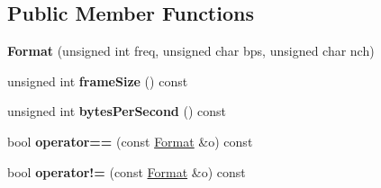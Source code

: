 \subsection*{Public Member Functions}
\begin{DoxyCompactItemize}
\item 
{\bfseries Format} (unsigned int freq, unsigned char bps, unsigned char nch)\hypertarget{structAudio_1_1Format_a7ec0f8459bfb19ee0994865d88bf6680}{}\label{structAudio_1_1Format_a7ec0f8459bfb19ee0994865d88bf6680}

\item 
unsigned int {\bfseries frame\+Size} () const \hypertarget{structAudio_1_1Format_a3bb725504e8f6a166c06c8ba29d3ea15}{}\label{structAudio_1_1Format_a3bb725504e8f6a166c06c8ba29d3ea15}

\item 
unsigned int {\bfseries bytes\+Per\+Second} () const \hypertarget{structAudio_1_1Format_a8446b7fdb18fa9e4b207ddf32921f8bd}{}\label{structAudio_1_1Format_a8446b7fdb18fa9e4b207ddf32921f8bd}

\item 
bool {\bfseries operator==} (const \hyperlink{structAudio_1_1Format}{Format} \&o) const \hypertarget{structAudio_1_1Format_a6d326b9faad2cd23e9cf23a0f4dd0355}{}\label{structAudio_1_1Format_a6d326b9faad2cd23e9cf23a0f4dd0355}

\item 
bool {\bfseries operator!=} (const \hyperlink{structAudio_1_1Format}{Format} \&o) const \hypertarget{structAudio_1_1Format_a6e60fbf6af3de5b8dc0aade53dcad1b3}{}\label{structAudio_1_1Format_a6e60fbf6af3de5b8dc0aade53dcad1b3}

\end{DoxyCompactItemize}
